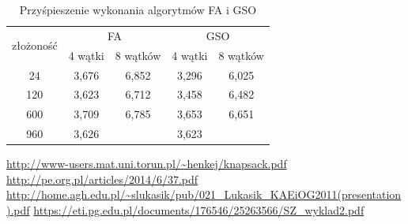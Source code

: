 \documentclass[11pt,a4paper,twoside]{article}
\begin{document}
\bgroup
\def\arraystretch{1.1}
\begin{table}[ht]
\caption{Przyśpieszenie wykonania algorytmów FA i GSO}
\label{MPIprzysp}
\centering
\begin{tabular}{|c||c|c||c|c|}
\hline
 \multirow{2}{*}{złożoność} & \multicolumn{2}{c||}{FA} & \multicolumn{2}{c|}{GSO} \\\cline{2-5}
 & 4 wątki & 8 wątków & 4 wątki & 8 wątków \\\hline
 24 & 3,676 & 6,852 & 3,296 & 6,025\\\hline
 120 & 3,623 & 6,712 & 3,458 & 6,482 \\\hline
 600 & 3,709 & 6,785 & 3,653 & 6,651 \\\hline
 960 & 3,626 &  & 3,623 &  \\\hline
\end{tabular}
\end{table}
\egroup
\vspace*{1\baselineskip}




\begin{thebibliography}{9}
\url{http://www-users.mat.uni.torun.pl/~henkej/knapsack.pdf}
\url{http://pe.org.pl/articles/2014/6/37.pdf}
\url{http://home.agh.edu.pl/~slukasik/pub/021_Lukasik_KAEiOG2011(presentation).pdf}
\url{https://eti.pg.edu.pl/documents/176546/25263566/SZ_wyklad2.pdf}

\end{thebibliography}
\end{document}
